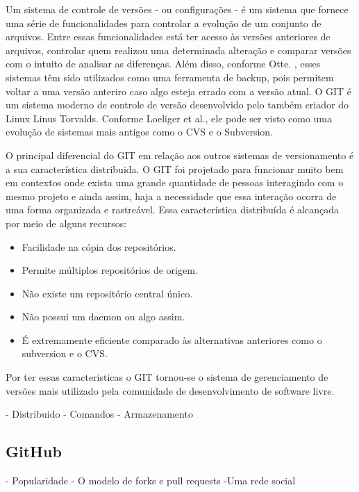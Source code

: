 Um sistema de controle de versões - ou configurações - é um sistema que fornece uma série de funcionalidades para controlar a evolução de um conjunto de arquivos. Entre essas funcionalidades está ter acesso às versões anteriores de arquivos, controlar quem realizou uma determinada alteração e comparar versões com o intuito de analisar as diferenças.  Além disso, conforme Otte. \cite{otte2009version}, esses sistemas têm sido utilizados como uma ferramenta de backup, pois  permitem voltar a uma versão anteriro caso algo esteja errado com a versão atual. O GIT é um sistema moderno de controle de versão desenvolvido pelo também criador do Linux Linus Torvalds. Conforme Loeliger et al.\cite{loeliger2012version}, ele pode ser visto como uma evolução de sistemas mais antigos como o CVS\cite{vesperman2006essential} e o Subversion\cite{pilato2008version}. 

O principal diferencial do GIT em relação aos outros sistemas de versionamento é a sua característica distribuida. O GIT foi projetado para funcionar muito bem em contextos onde exista uma grande quantidade de pessoas interagindo com o mesmo projeto e ainda assim, haja a necessidade que essa interação ocorra de uma forma organizada e rastreável. Essa característica distribuída é alcançada por meio de alguns recursos:

\begin{itemize}
\item Facilidade na cópia dos repositórios.
\item Permite múltiplos repositórios de origem.
\item Não existe um repositório central único.
\item Não possui um daemon ou algo assim.
\item É extremamente eficiente comparado às alternativas anteriores como o subversion e o CVS.

\end{itemize}

Por ter essas caracteristicas o GIT tornou-se o sistema de gerenciamento de versões mais utilizado pela comunidade de desenvolvimento de software livre.  

- Distribuido
- Comandos
- Armazenamento


\subsection{GitHub}

- Popularidade
- O modelo de forks e pull requests 
-Uma rede social



